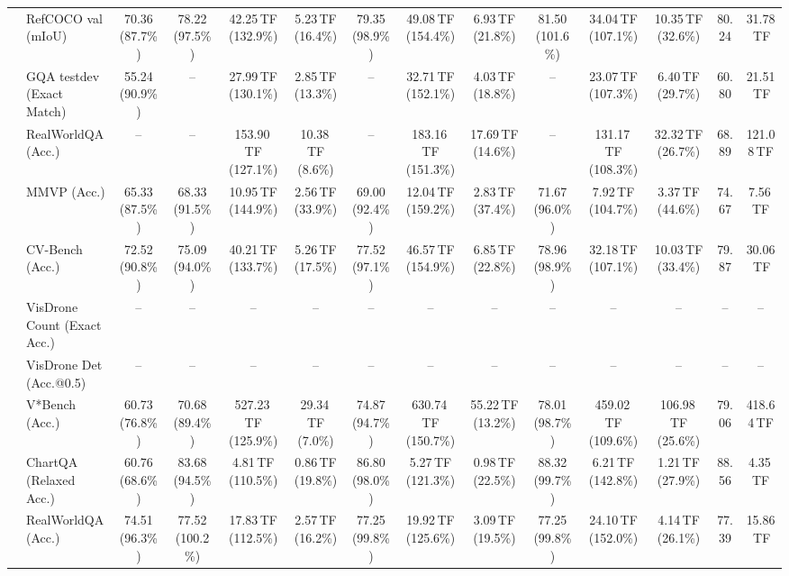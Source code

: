 \begin{table}[t]
\begin{center}
\begin{small}
\begin{sc}
{\begin{tabular}{llcccccccccccc}
& RefCOCO val (mIoU) & 70.36 (87.7\%) & 78.22 (97.5\%) & 42.25\,TF (132.9\%) & 5.23\,TF (16.4\%) & 79.35 (98.9\%) & 49.08\,TF (154.4\%) & 6.93\,TF (21.8\%) & 81.50 (101.6\%) & 34.04\,TF (107.1\%) & 10.35\,TF (32.6\%) & 80.24 & 31.78\,TF \\
& GQA testdev (Exact Match) & 55.24 (90.9\%) & -- & 27.99\,TF (130.1\%) & 2.85\,TF (13.3\%) & -- & 32.71\,TF (152.1\%) & 4.03\,TF (18.8\%) & -- & 23.07\,TF (107.3\%) & 6.40\,TF (29.7\%) & 60.80 & 21.51\,TF \\
& RealWorldQA (Acc.) & -- & -- & 153.90\,TF (127.1\%) & 10.38\,TF (8.6\%) & -- & 183.16\,TF (151.3\%) & 17.69\,TF (14.6\%) & -- & 131.17\,TF (108.3\%) & 32.32\,TF (26.7\%) & 68.89 & 121.08\,TF \\
& MMVP (Acc.) & 65.33 (87.5\%) & 68.33 (91.5\%) & 10.95\,TF (144.9\%) & 2.56\,TF (33.9\%) & 69.00 (92.4\%) & 12.04\,TF (159.2\%) & 2.83\,TF (37.4\%) & 71.67 (96.0\%) & 7.92\,TF (104.7\%) & 3.37\,TF (44.6\%) & 74.67 & 7.56\,TF \\
& CV-Bench (Acc.) & 72.52 (90.8\%) & 75.09 (94.0\%) & 40.21\,TF (133.7\%) & 5.26\,TF (17.5\%) & 77.52 (97.1\%) & 46.57\,TF (154.9\%) & 6.85\,TF (22.8\%) & 78.96 (98.9\%) & 32.18\,TF (107.1\%) & 10.03\,TF (33.4\%) & 79.87 & 30.06\,TF \\
& VisDrone Count (Exact Acc.) & -- & -- & -- & -- & -- & -- & -- & -- & -- & -- & -- & -- \\
& VisDrone Det (Acc.@0.5) & -- & -- & -- & -- & -- & -- & -- & -- & -- & -- & -- & -- \\
& V*Bench (Acc.) & 60.73 (76.8\%) & 70.68 (89.4\%) & 527.23\,TF (125.9\%) & 29.34\,TF (7.0\%) & 74.87 (94.7\%) & 630.74\,TF (150.7\%) & 55.22\,TF (13.2\%) & 78.01 (98.7\%) & 459.02\,TF (109.6\%) & 106.98\,TF (25.6\%) & 79.06 & 418.64\,TF \\
\midrule
{}
& ChartQA (Relaxed Acc.) & 60.76 (68.6\%) & 83.68 (94.5\%) & 4.81\,TF (110.5\%) & 0.86\,TF (19.8\%) & 86.80 (98.0\%) & 5.27\,TF (121.3\%) & 0.98\,TF (22.5\%) & 88.32 (99.7\%) & 6.21\,TF (142.8\%) & 1.21\,TF (27.9\%) & 88.56 & 4.35\,TF \\
& RealWorldQA (Acc.) & 74.51 (96.3\%) & 77.52 (100.2\%) & 17.83\,TF (112.5\%) & 2.57\,TF (16.2\%) & 77.25 (99.8\%) & 19.92\,TF (125.6\%) & 3.09\,TF (19.5\%) & 77.25 (99.8\%) & 24.10\,TF (152.0\%) & 4.14\,TF (26.1\%) & 77.39 & 15.86\,TF \\

\end{tabular}}
\end{sc}
\end{small}
\end{center}
\end{table}
